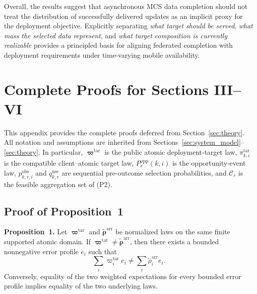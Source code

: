 \documentclass[letterpaper,journal]{IEEEtran}
\begin{document}
Overall, the results suggest that asynchronous MCS data completion should not
treat the distribution of successfully delivered updates as an implicit proxy
for the deployment objective.  Explicitly separating \emph{what target should
be served}, \emph{what mass the selected data represent}, and \emph{what target
composition is currently realizable} provides a principled basis for aligning
federated completion with deployment requirements under time-varying mobile
availability.










\newpage
\appendices
\section{Complete Proofs for Sections III--VI}
\label{app:complete_proofs}

This appendix provides the complete proofs deferred from
Section~\ref{sec:theory}.  All notation and assumptions are inherited from
Sections~\ref{sec:system_model}--\ref{sec:theory}.  In particular,
$\boldsymbol\varpi^{\mathrm{tar}}$ is the public atomic deployment-target law,
$\pi^{\mathrm{tar}}_{k,i}$ is the compatible client--atomic target law,
$P_r^{\mathrm{opp}}(k,i)$ is the opportunity-event law,
$p^{\mathrm{obs}}_{k,r,i}$ and $q^{\mathrm{use}}_{k,r}$ are sequential
pre-outcome selection probabilities, and $\mathcal{C}_r$ is the feasible
aggregation set of (P2).

\subsection{Proof of Proposition~1}
\label{app:proof_prop1}

\noindent\textbf{Proposition~1.}
Let $\boldsymbol\varpi^{\mathrm{tar}}$ and
$\widetilde{\boldsymbol\rho}^{\mathrm{arr}}$ be normalized laws on the same
finite supported atomic domain.  If
$\boldsymbol\varpi^{\mathrm{tar}}\neq
\widetilde{\boldsymbol\rho}^{\mathrm{arr}}$, then there exists a bounded
nonnegative error profile $e_i$ such that
\begin{equation}
    \sum_i \varpi_i^{\mathrm{tar}}e_i
    \neq
    \sum_i \widetilde\rho_i^{\mathrm{arr}}e_i.
    \label{eq:app_prop1_claim}
\end{equation}
Conversely, equality of the two weighted expectations for every bounded error
profile implies equality of the two underlying laws.
\end{document}
